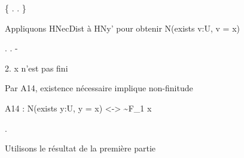 \documentclass[10pt]{report}
\begin{document}
\begin{coqdoccode}
\coqdocindent{2.00em}
\{  .  . \}\coqdoceol
\coqdocindent{2.00em}
\coqdoceol
\coqdocindent{2.00em}
\begin{coqdoccomment}
\coqdocindent{0.50em}
Appliquons\coqdocindent{0.50em}
HNecDist\coqdocindent{0.50em}
à\coqdocindent{0.50em}
HNy'\coqdocindent{0.50em}
pour\coqdocindent{0.50em}
obtenir\coqdocindent{0.50em}
N(exists\coqdocindent{0.50em}
v:U,\coqdocindent{0.50em}
v\coqdocindent{0.50em}
=\coqdocindent{0.50em}
x)\coqdocindent{0.50em}
\end{coqdoccomment}
\coqdoceol
\coqdocindent{2.00em}
 .  .\coqdoceol
\coqdocemptyline
\coqdocindent{1.00em}
- \begin{coqdoccomment}
\coqdocindent{0.50em}
2.\coqdocindent{0.50em}
x\coqdocindent{0.50em}
n'est\coqdocindent{0.50em}
pas\coqdocindent{0.50em}
fini\coqdocindent{0.50em}
\end{coqdoccomment}
\coqdoceol
\coqdocindent{2.00em}
\begin{coqdoccomment}
\coqdocindent{0.50em}
Par\coqdocindent{0.50em}
A14,\coqdocindent{0.50em}
existence\coqdocindent{0.50em}
nécessaire\coqdocindent{0.50em}
implique\coqdocindent{0.50em}
non-finitude\coqdocindent{0.50em}
\end{coqdoccomment}
\coqdoceol
\coqdocindent{2.00em}
\begin{coqdoccomment}
\coqdocindent{0.50em}
A14\coqdocindent{0.50em}
:\coqdocindent{0.50em}
N(exists\coqdocindent{0.50em}
y:U,\coqdocindent{0.50em}
y\coqdocindent{0.50em}
=\coqdocindent{0.50em}
x)\coqdocindent{0.50em}
<->\coqdocindent{0.50em}
\~{}F\_1\coqdocindent{0.50em}
x\coqdocindent{0.50em}
\end{coqdoccomment}
\coqdoceol
\coqdocindent{2.00em}
 .\coqdoceol
\coqdocemptyline
\coqdocindent{2.00em}
\begin{coqdoccomment}
\coqdocindent{0.50em}
Utilisons\coqdocindent{0.50em}
le\coqdocindent{0.50em}
résultat\coqdocindent{0.50em}
de\coqdocindent{0.50em}
la\coqdocindent{0.50em}
première\coqdocindent{0.50em}
partie\coqdocindent{0.50em}
\end{coqdoccomment}
\coqdoceol
\coqdocindent{2.00em}

\end{coqdoccode}
\end{document}
